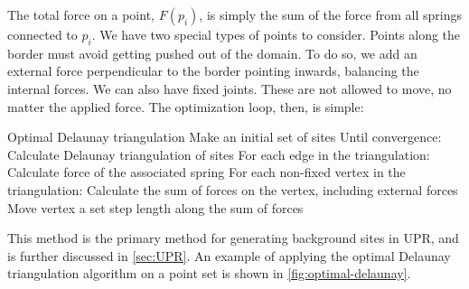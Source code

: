 The total force on a point, $F(p_i)$, is simply the sum of the force from all springs connected to $p_i$. We have two special types of points to consider. Points along the border must avoid getting pushed out of the domain. To do so, we add an external force perpendicular to the border pointing inwards, balancing the internal forces. We can also have fixed joints. These are not allowed to move, no matter the applied force. The optimization loop, then, is simple:

\begin{pseudocode}[label=alg:delaunay_force]{Optimal Delaunay triangulation}
    Make an initial set of sites
    Until convergence:
        Calculate Delaunay triangulation of sites
        For each edge in the triangulation:
            Calculate force of the associated spring
        For each non-fixed vertex in the triangulation:
            Calculate the sum of forces on the vertex, including external forces
            Move vertex a set step length along the sum of forces
\end{pseudocode}

This method is the primary method for generating background sites in UPR, and is further discussed in \autoref{sec:UPR}. An example of applying the optimal Delaunay triangulation algorithm on a point set is shown in \autoref{fig:optimal-delaunay}.

